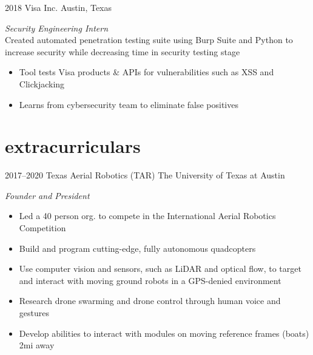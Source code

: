 \documentclass[]{friggeri-cv} %
\begin{document}
\begin{entrylist}
	
	\entry
	{2018}
	{Visa Inc.}
	{Austin, Texas}
	{\emph{Security Engineering Intern} \\
			Created automated penetration testing suite using Burp Suite and Python to increase security while decreasing time in security testing stage
			\begin{itemize}
				\item Tool tests Visa products \& APIs for vulnerabilities such as XSS and Clickjacking
				\item Learns from cybersecurity team to eliminate false positives
			\end{itemize}
	}

\end{entrylist}

\vspace{-5pt}
\section{extracurriculars}
\vspace{-10pt}

\begin{entrylist}
	
	\entry
	{2017--2020}
	{Texas Aerial Robotics (TAR)}
	{The University of Texas at Austin}
	{
		\emph{Founder and President}
		\begin{itemize}
			\item Led a 40 person org. to compete in the International Aerial Robotics Competition
			\item Build and program cutting-edge, fully autonomous quadcopters
			\item Use computer vision and sensors, such as LiDAR and optical flow, to target and interact with moving ground robots in a GPS-denied environment
			\item Research drone swarming and drone control through human voice and gestures
			\item Develop abilities to interact with modules on moving reference frames (boats) 2mi away
		\end{itemize}
	}
	
\end{entrylist}

\vspace{-25pt}
\end{document}
